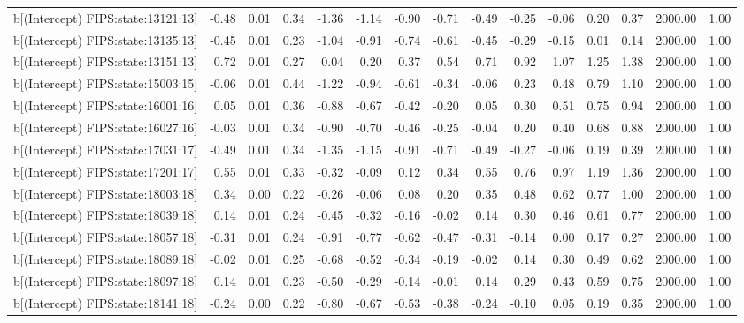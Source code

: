 \begin{table}[ht]
\begin{tabular}{rrrrrrrrrrrrrrr}
  b[(Intercept) FIPS:state:13121:13] & -0.48 & 0.01 & 0.34 & -1.36 & -1.14 & -0.90 & -0.71 & -0.49 & -0.25 & -0.06 & 0.20 & 0.37 & 2000.00 & 1.00 \\ 
  b[(Intercept) FIPS:state:13135:13] & -0.45 & 0.01 & 0.23 & -1.04 & -0.91 & -0.74 & -0.61 & -0.45 & -0.29 & -0.15 & 0.01 & 0.14 & 2000.00 & 1.00 \\ 
  b[(Intercept) FIPS:state:13151:13] & 0.72 & 0.01 & 0.27 & 0.04 & 0.20 & 0.37 & 0.54 & 0.71 & 0.92 & 1.07 & 1.25 & 1.38 & 2000.00 & 1.00 \\ 
  b[(Intercept) FIPS:state:15003:15] & -0.06 & 0.01 & 0.44 & -1.22 & -0.94 & -0.61 & -0.34 & -0.06 & 0.23 & 0.48 & 0.79 & 1.10 & 2000.00 & 1.00 \\ 
  b[(Intercept) FIPS:state:16001:16] & 0.05 & 0.01 & 0.36 & -0.88 & -0.67 & -0.42 & -0.20 & 0.05 & 0.30 & 0.51 & 0.75 & 0.94 & 2000.00 & 1.00 \\ 
  b[(Intercept) FIPS:state:16027:16] & -0.03 & 0.01 & 0.34 & -0.90 & -0.70 & -0.46 & -0.25 & -0.04 & 0.20 & 0.40 & 0.68 & 0.88 & 2000.00 & 1.00 \\ 
  b[(Intercept) FIPS:state:17031:17] & -0.49 & 0.01 & 0.34 & -1.35 & -1.15 & -0.91 & -0.71 & -0.49 & -0.27 & -0.06 & 0.19 & 0.39 & 2000.00 & 1.00 \\ 
  b[(Intercept) FIPS:state:17201:17] & 0.55 & 0.01 & 0.33 & -0.32 & -0.09 & 0.12 & 0.34 & 0.55 & 0.76 & 0.97 & 1.19 & 1.36 & 2000.00 & 1.00 \\ 
  b[(Intercept) FIPS:state:18003:18] & 0.34 & 0.00 & 0.22 & -0.26 & -0.06 & 0.08 & 0.20 & 0.35 & 0.48 & 0.62 & 0.77 & 1.00 & 2000.00 & 1.00 \\ 
  b[(Intercept) FIPS:state:18039:18] & 0.14 & 0.01 & 0.24 & -0.45 & -0.32 & -0.16 & -0.02 & 0.14 & 0.30 & 0.46 & 0.61 & 0.77 & 2000.00 & 1.00 \\ 
  b[(Intercept) FIPS:state:18057:18] & -0.31 & 0.01 & 0.24 & -0.91 & -0.77 & -0.62 & -0.47 & -0.31 & -0.14 & 0.00 & 0.17 & 0.27 & 2000.00 & 1.00 \\ 
  b[(Intercept) FIPS:state:18089:18] & -0.02 & 0.01 & 0.25 & -0.68 & -0.52 & -0.34 & -0.19 & -0.02 & 0.14 & 0.30 & 0.49 & 0.62 & 2000.00 & 1.00 \\ 
  b[(Intercept) FIPS:state:18097:18] & 0.14 & 0.01 & 0.23 & -0.50 & -0.29 & -0.14 & -0.01 & 0.14 & 0.29 & 0.43 & 0.59 & 0.75 & 2000.00 & 1.00 \\ 
  b[(Intercept) FIPS:state:18141:18] & -0.24 & 0.00 & 0.22 & -0.80 & -0.67 & -0.53 & -0.38 & -0.24 & -0.10 & 0.05 & 0.19 & 0.35 & 2000.00 & 1.00 \\ 

\end{tabular}
\end{table}
